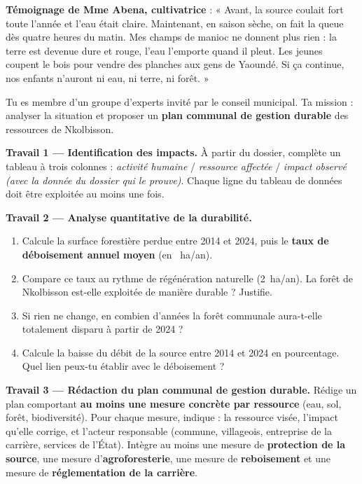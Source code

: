 \documentclass[11pt]{article}
\newcounter{popsec}
\newcounter{popsub}
\newcommand{\courssub}[1]{%
  \stepcounter{popsub}%
  \par\vspace{9pt}\noindent{\popxbold\fontsize{11.5}{13}\selectfont\color{popink}{\color{poporange}\thepopsec.\thepopsub}\hspace{6pt}#1}\par\nopagebreak\vspace{4pt}
}
\begin{document}
\textbf{Témoignage de Mme Abena, cultivatrice} : « Avant, la source coulait fort toute l'année et l'eau était claire. Maintenant, en saison sèche, on fait la queue dès quatre heures du matin. Mes champs de manioc ne donnent plus rien : la terre est devenue dure et rouge, l'eau l'emporte quand il pleut. Les jeunes coupent le bois pour vendre des planches aux gens de Yaoundé. Si ça continue, nos enfants n'auront ni eau, ni terre, ni forêt. »

Tu es membre d'un groupe d'experts invité par le conseil municipal. Ta mission : analyser la situation et proposer un \textbf{plan communal de gestion durable} des ressources de Nkolbisson.

\courssub{Consignes}

\textbf{Travail 1 — Identification des impacts.} À partir du dossier, complète un tableau à trois colonnes : \emph{activité humaine} / \emph{ressource affectée} / \emph{impact observé (avec la donnée du dossier qui le prouve)}. Chaque ligne du tableau de données doit être exploitée au moins une fois.

\textbf{Travail 2 — Analyse quantitative de la durabilité.}
\begin{enumerate}
\item Calcule la surface forestière perdue entre 2014 et 2024, puis le \textbf{taux de déboisement annuel moyen} (en \SI{}{ha/an}).
\item Compare ce taux au rythme de régénération naturelle (\SI{2}{ha/an}). La forêt de Nkolbisson est-elle exploitée de manière durable ? Justifie.
\item Si rien ne change, en combien d'années la forêt communale aura-t-elle totalement disparu à partir de 2024 ?
\item Calcule la baisse du débit de la source entre 2014 et 2024 en pourcentage. Quel lien peux-tu établir avec le déboisement ?
\end{enumerate}

\textbf{Travail 3 — Rédaction du plan communal de gestion durable.} Rédige un plan comportant \textbf{au moins une mesure concrète par ressource} (eau, sol, forêt, biodiversité). Pour chaque mesure, indique : la ressource visée, l'impact qu'elle corrige, et l'acteur responsable (commune, villageois, entreprise de la carrière, services de l'État). Intègre au moins une mesure de \textbf{protection de la source}, une mesure d'\textbf{agroforesterie}, une mesure de \textbf{reboisement} et une mesure de \textbf{réglementation de la carrière}.
\end{document}
